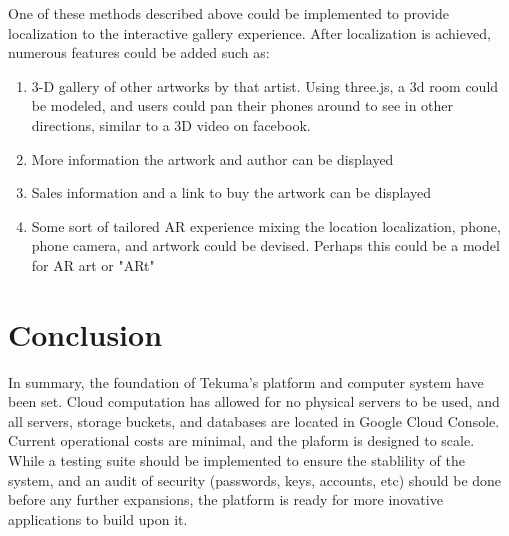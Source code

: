 \documentclass[fontsize=12pt]{scrartcl} %
\begin{document}
One of these methods described above could be implemented to provide localization to the interactive gallery experience. After localization is achieved, numerous features could be added such as:
\begin{enumerate}
    \item 3-D gallery of other artworks by that artist. Using three.js, a 3d room could be modeled, and users could pan their phones around to see in other directions, similar to a 3D video on facebook.
    \item More information the artwork and author can be displayed
    \item Sales information and a link to buy the artwork can be displayed
    \item Some sort of tailored AR experience mixing the location localization, phone, phone camera, and artwork could be devised. Perhaps this could be a model for AR art or "ARt"
\end{enumerate}

\section{Conclusion}
In summary, the foundation of Tekuma's platform and computer system have been set. Cloud computation has allowed for no physical servers to be used, and all servers, storage buckets, and databases are located in Google Cloud Console. Current operational costs are minimal, and the plaform is designed to scale. While a testing suite should be implemented to ensure the stablility of the system, and an audit of security (passwords, keys, accounts, etc) should be done before any further expansions, the platform is ready for more inovative applications to build upon it.
\end{document}
